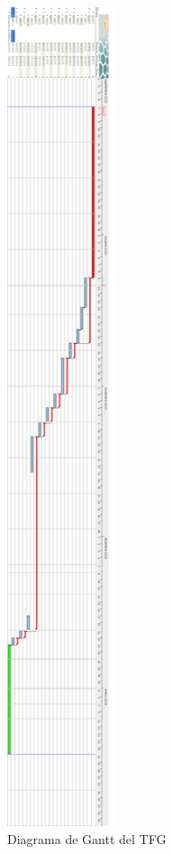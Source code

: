 	\begin{figure}[H]
		\centering
		\includegraphics[height=240mm, fbox={\fboxrule} 4mm]{images/05-resultados/01-gantt.png}
		\caption{Diagrama de Gantt del \ac{TFG}}
		\label{fig:gantt}
	\end{figure}
	
